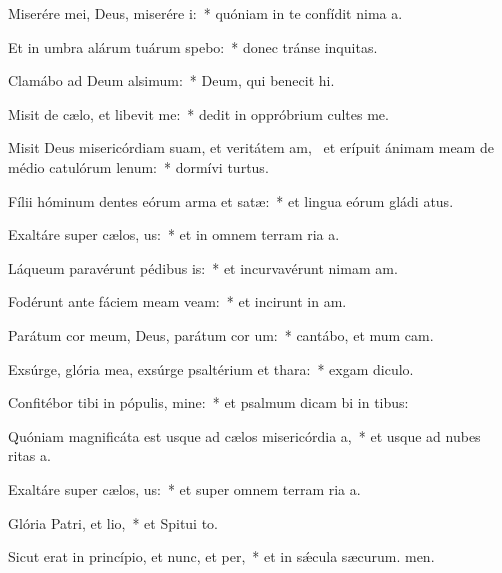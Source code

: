 \item Miserére mei, Deus, miserére i:~* quóniam in te confídit nima a.
\item Et in umbra alárum tuárum spebo:~* donec tránse inquitas.
\item Clamábo ad Deum alsimum:~* Deum, qui benecit hi.
\item Misit de cælo, et libevit me:~* dedit in oppróbrium cultes me.
\item Misit Deus misericórdiam suam, et veritátem am,~\pscross{} et erípuit ánimam meam de médio catulórum lenum:~* dormívi turtus.
\item Fílii hóminum dentes eórum arma et satæ:~* et lingua eórum gládi atus.
\item Exaltáre super cælos, us:~* et in omnem terram ria a.
\item Láqueum paravérunt pédibus is:~* et incurvavérunt nimam am.
\item Fodérunt ante fáciem meam veam:~* et incirunt in am.
\item Parátum cor meum, Deus, parátum cor um:~* cantábo, et mum cam.
\item Exsúrge, glória mea, exsúrge psaltérium et thara:~* exgam diculo.
\item Confitébor tibi in pópulis, mine:~* et psalmum dicam bi in tibus:
\item Quóniam magnificáta est usque ad cælos misericórdia a,~* et usque ad nubes ritas a.
\item Exaltáre super cælos, us:~* et super omnem terram ria a.
\item Glória Patri, et lio,~* et Spitui to.
\item Sicut erat in princípio, et nunc, et per,~* et in sǽcula sæcurum. men.
